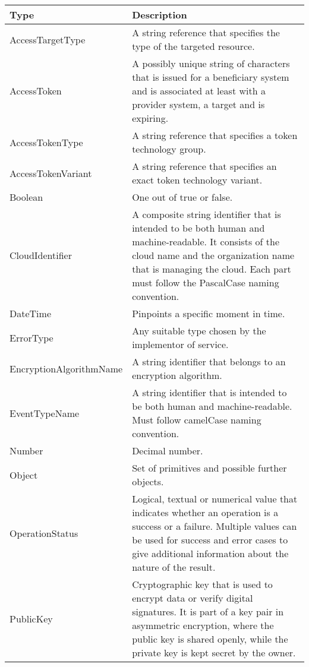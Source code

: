 \documentclass[a4paper]{arrowhead}
\newcommand{\pdef}[1]{{\textcolor{ArrowheadGrey}{#1\label{sec:model:primitives:#1}\label{sec:model:primitives:#1s}\label{sec:model:primitives:#1es}}}}
\begin{document}
\begin{table}[ht!]
\begin{tabularx}{\textwidth}{| p{5cm} | X |} \hline
\rowcolor{gray!33} Type & Description \\ \hline
\pdef{AccessTargetType} & A string reference that specifies the type of the targeted resource. \\ \hline
\pdef{AccessToken} & A possibly unique string of characters that is issued for a beneficiary system and is associated at least with a provider system, a target and is expiring.\\ \hline
\pdef{AccessTokenType} & A string reference that specifies a token technology group.\\ \hline
\pdef{AccessTokenVariant} & A string reference that specifies an exact token technology variant.\\ \hline
\pdef{Boolean}          & One out of true or false. \\ \hline
\pdef{CloudIdentifier} & A composite string identifier that is intended to be both human and machine-readable. It consists of the cloud name and the organization name that is managing the cloud. Each part must follow the PascalCase naming convention. \\ \hline
\pdef{DateTime}         & Pinpoints a specific moment in time. \\ \hline
\pdef{ErrorType}        & Any suitable type chosen by the implementor of service. \\ \hline
\pdef{EncryptionAlgorithmName} & A string identifier that belongs to an encryption algorithm. \\ \hline
\pdef{EventTypeName}      & A string identifier that is intended to be both human and machine-readable. Must follow camelCase naming convention. \\ \hline
\pdef{Number}           & Decimal number. \\ \hline
\pdef{Object}           & Set of primitives and possible further objects. \\ \hline
\pdef{OperationStatus}  & Logical, textual or numerical value that indicates whether an operation is a success or a failure. Multiple values can be used for success and error cases to give additional information about the nature of the result. \\ \hline
\pdef{PublicKey} & Cryptographic key that is used to encrypt data or verify digital signatures. It is part of a key pair in asymmetric encryption, where the public key is shared openly, while the private key is kept secret by the owner. \\ \hline

\end{tabularx}
\end{table}
\end{document}
